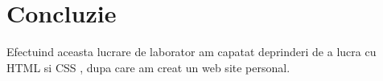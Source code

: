 \section*{Concluzie}


Efectuind aceasta lucrare de laborator am capatat deprinderi de a lucra cu HTML si CSS , dupa care am creat un web site personal.

